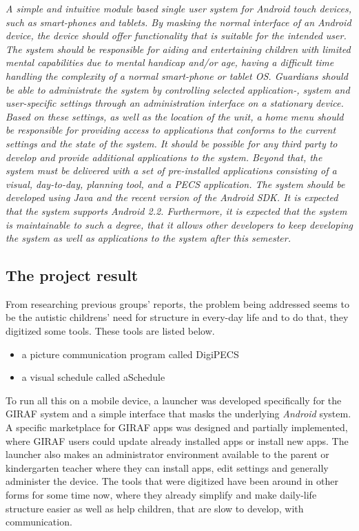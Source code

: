 \textit{A simple and intuitive module based single user system for Android touch devices, such as smart-phones and tablets. By masking the normal interface of an Android device, the device should offer functionality that is suitable for the intended user.
The system should be responsible for aiding and entertaining children with limited mental capabilities due to mental handicap and/or age, having a difficult time handling the complexity of a normal smart-phone or tablet OS. Guardians should be able to administrate the system by controlling selected application-, system and user-specific settings through an administration interface on a stationary device. Based on these settings, as well as the location of the unit, a home menu should be responsible for providing access to applications that conforms to the current settings and the state of the system. It should be possible for any third party to develop and provide additional applications to the system. Beyond that, the system must be delivered with a set of pre-installed applications consisting of a visual, day-to-day, planning tool, and a PECS application. The system should be developed using Java and the recent version of the Android SDK. It is expected that the system supports Android 2.2. Furthermore, it is expected that the system is maintainable to such a degree, that it allows other developers to keep developing the system as well as applications to the system after this semester.}

\subsection{The project result}
From researching previous groups' reports, the problem being addressed seems to be the autistic childrens' need for structure in every-day life and to do that, they digitized some tools. These tools are listed below.
\begin{itemize}
	\item a picture communication program called DigiPECS
	\item a visual schedule called aSchedule
\end{itemize}

To run all this on a mobile device, a launcher was developed specifically for the GIRAF system and a simple interface that masks the underlying \textit{Android} system. A specific marketplace for GIRAF apps was designed and partially implemented, where GIRAF users could update already installed apps or install new apps. The launcher also makes an administrator environment available to the parent or kindergarten teacher where they can install apps, edit settings and generally administer the device.
The tools that were digitized have been around in other forms for some time now, where they already simplify and make daily-life structure easier as well as help children, that are slow to develop, with communication.

